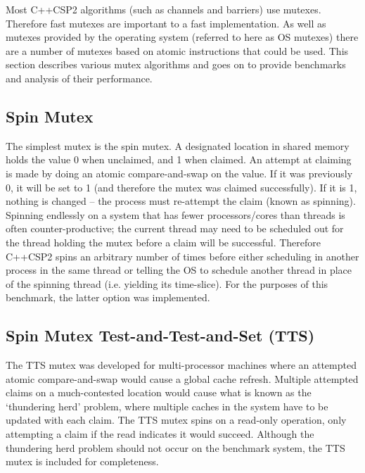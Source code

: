 \documentclass[12pt]{IOS-Book-Article-CPA-2007}
\begin{document}
\label{sec-mutex}

Most C++CSP2 algorithms (such as channels and barriers) use mutexes.  Therefore fast mutexes are important to a fast implementation.
As well as mutexes provided by the operating system (referred to here as OS mutexes) there are a number of mutexes based on atomic instructions that could
be used.  This section describes various mutex algorithms and goes on to provide benchmarks and analysis of their performance.

\subsection{Spin Mutex}

\label{sec-mutex-spin}

The simplest mutex is the spin mutex.  A designated location in shared memory holds the value 0 when unclaimed, and 1 when claimed.  An attempt at claiming
is made by doing an atomic compare-and-swap on the value.  If it was previously 0, it will be set to 1 (and therefore the mutex was claimed successfully).  
If it is 1, nothing is changed -- the process must re-attempt the claim (known as spinning).  Spinning endlessly on a system that has fewer processors/cores than
threads is often counter-productive; the current thread may need to be scheduled out for the thread holding the mutex before a claim will be successful.
Therefore C++CSP2 spins an arbitrary number of times before either scheduling in another process in the same thread or telling the OS to schedule
another thread in place of the spinning thread (i.e. yielding its time-slice).  For the purposes of this benchmark, the latter option was implemented.

\subsection{Spin Mutex Test-and-Test-and-Set (TTS)}

The TTS mutex was developed for multi-processor machines where an attempted atomic compare-and-swap would cause a global cache refresh.  Multiple attempted claims
on a much-contested location would cause what is known as the `thundering herd' problem, where multiple caches in the system have to be updated with 
each claim.  The TTS mutex spins on a read-only operation, only attempting a claim if the read indicates it would succeed.  Although the thundering 
herd problem should not occur on the benchmark system, the TTS mutex is included for completeness.
\end{document}
